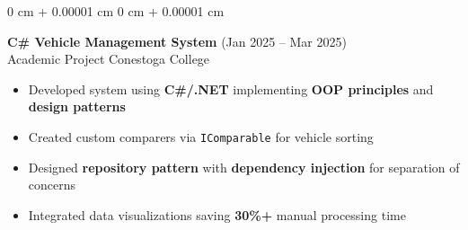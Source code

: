 \documentclass[10pt, letterpaper]{article}
\newenvironment{highlights}{
    \begin{itemize}[
        topsep=0.10 cm,
        parsep=0.10 cm,
        partopsep=0pt,
        itemsep=0pt,
        leftmargin=0 cm + 10pt
    ]
}{
    \end{itemize}
}
\newenvironment{onecolentry}{
    \begin{adjustwidth}{
        0 cm + 0.00001 cm
    }{
        0 cm + 0.00001 cm
    }
}{
    \end{adjustwidth}
}
\begin{document}
\begin{onecolentry}
    {\normalsize \textbf{C\# Vehicle Management System}} \hfill {(Jan 2025 – Mar 2025)}\\
    {Academic Project} \hfill {Conestoga College}\\
    \begin{highlights}
        \item Developed system using \textbf{C\#/.NET} implementing \textbf{OOP principles} and \textbf{design patterns}
        \item Created custom comparers via \texttt{IComparable} for vehicle sorting
        \item Designed \textbf{repository pattern} with \textbf{dependency injection} for separation of concerns
        \item Integrated data visualizations saving \textbf{30\%+} manual processing time
    \end{highlights}
\end{onecolentry}
\end{document}
